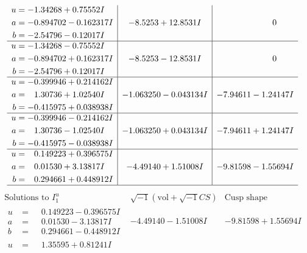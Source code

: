 \documentclass[1p]{elsarticle_modified}
\theoremstyle{definition}
\newcommand{\I}{\sqrt{-1}}
\begin{document}
$$\begin{array}{c|c|c}
\begin{aligned}
u &= -1.34268 + 0.75552 I \\
a &= -0.894702 - 0.162317 I \\
b &= -2.54796 - 0.12017 I\end{aligned}
 & -8.5253 + 12.8531 I & \phantom{-0.000000 } 0 \\ \hline\begin{aligned}
u &= -1.34268 - 0.75552 I \\
a &= -0.894702 + 0.162317 I \\
b &= -2.54796 + 0.12017 I\end{aligned}
 & -8.5253 - 12.8531 I & \phantom{-0.000000 } 0 \\ \hline\begin{aligned}
u &= -0.399946 + 0.214162 I \\
a &= \phantom{-}1.30736 + 1.02540 I \\
b &= -0.415975 + 0.038938 I\end{aligned}
 & -1.063250 - 0.043134 I & -7.94611 - 1.24147 I \\ \hline\begin{aligned}
u &= -0.399946 - 0.214162 I \\
a &= \phantom{-}1.30736 - 1.02540 I \\
b &= -0.415975 - 0.038938 I\end{aligned}
 & -1.063250 + 0.043134 I & -7.94611 + 1.24147 I \\ \hline\begin{aligned}
u &= \phantom{-}0.149223 + 0.396575 I \\
a &= \phantom{-}0.01530 + 3.13817 I \\
b &= \phantom{-}0.294661 + 0.448912 I\end{aligned}
 & -4.49140 + 1.51008 I & -9.81598 - 1.55694 I\\
 \hline 
 \end{array}$$\newpage$$\begin{array}{c|c|c}  
\text{Solutions to }I^u_{1}& \I (\text{vol} + \sqrt{-1}CS) & \text{Cusp shape}\\
 \hline 
\begin{aligned}
u &= \phantom{-}0.149223 - 0.396575 I \\
a &= \phantom{-}0.01530 - 3.13817 I \\
b &= \phantom{-}0.294661 - 0.448912 I\end{aligned}
 & -4.49140 - 1.51008 I & -9.81598 + 1.55694 I \\ \hline\begin{aligned}
u &= \phantom{-}1.35595 + 0.81241 I \\

\end{aligned}
\end{array}$$
\end{document}
